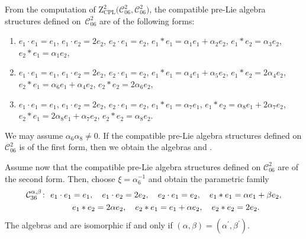 \documentclass[10pt,a4paper]{amsart}
\numberwithin{equation}{section}
\begin{document}
From the computation of $\mathrm{Z}_{\mathrm{CPL}}^{2}\bigl(\mathcal{C}_{06}^{2},%
\mathcal{C}_{06}^{2}\bigr)$, the compatible pre-Lie algebra structures defined on~$\mathcal{C}_{06}^{2}$ are of the following forms:
\begin{enumerate}\itemsep=0pt
\item[(1)] $e_{1}\cdot e_{1}=e_{1}$, $e_{1}\cdot e_{2}=2e_{2}$, $e_{2}\cdot
e_{1}=e_{2}$,
$e_{1}\ast e_{1}=\alpha _{1}e_{1}+\alpha _{2}e_{2}$, $e_{1}\ast
e_{2}=\alpha _{3}e_{2}$, $e_{2}\ast e_{1}=\alpha _{1}e_{2}$,

\item[(2)] $e_{1}\cdot e_{1}=e_{1}$, $e_{1}\cdot e_{2}=2e_{2}$, $e_{2}\cdot
e_{1}=e_{2}$, $e_{1}\ast e_{1}=\alpha _{4}e_{1}+\alpha _{5}e_{2}$, $e_{1}\ast
e_{2}=2\alpha _{4}e_{2}$, $e_{2}\ast e_{1}=\alpha _{6}e_{1}+\alpha
_{4}e_{2}$, $e_{2}\ast e_{2}=2\alpha _{6}e_{2}$,

\item[(3)] $e_{1}\cdot e_{1}=e_{1}$, $e_{1}\cdot e_{2}=2e_{2}$, $e_{2}\cdot
e_{1}=e_{2}$,
$e_{1}\ast e_{1}=\alpha _{7}e_{1}$, $e_{1}\ast e_{2}=\alpha
_{8}e_{1}+2\alpha _{7}e_{2}$, $e_{2}\ast e_{1}=2\alpha _{8}e_{1}+\alpha
_{7}e_{2}$, $e_{2}\ast e_{2}=\alpha _{8}e_{2}$.
\end{enumerate}

We may assume $\alpha _{6}\alpha _{8}\neq 0$.
If the compatible pre-Lie
algebra structures defined on $\mathcal{C}_{06}^{2}$ is of the first form,
then we obtain the algebras 
and .

Assume now that the
compatible pre-Lie algebra structures defined on $\mathcal{C}_{06}^{2}$ are
of the second form. Then, choose $\xi ={\alpha^{-1} _{6}}$ and obtain the
parametric family
\begin{gather*}
\mathcal{C}_{36}^{\alpha ,\beta } \colon \
e_{1}\cdot e_{1}=e_{1}, \quad e_{1}\cdot e_{2}=2e_{2}, \quad e_{2}\cdot
e_{1}=e_{2}, \quad e_{1}\ast e_{1}=\alpha e_{1}+\beta e_{2}, \\
\hphantom{\mathcal{C}_{36}^{\alpha ,\beta } \colon} \
 e_{1}\ast e_{2}=2\alpha e_{2}, \quad e_{2}\ast e_{1}=e_{1}+\alpha e_{2}, \quad e_{2}\ast e_{2}=2e_{2}.
\end{gather*}
The algebras \smash{$\mathcal{C}_{36}^{\alpha ,\beta }$} and  are isomorphic if and only if $(\alpha,\beta)= (\alpha^{\prime },\beta ^{\prime })$.
\end{document}
